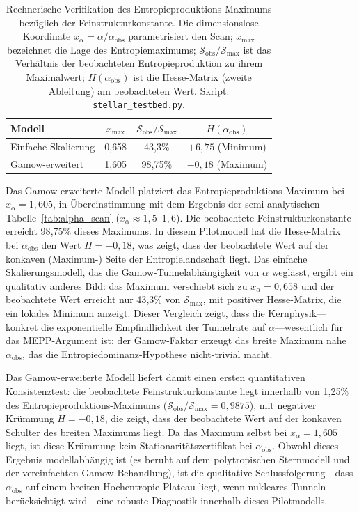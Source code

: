 \documentclass[12pt,a4paper]{article}
\theoremstyle{remark}
\begin{document}
\begin{table}[ht]
\centering
\caption{Rechnerische Verifikation des Entropieproduktions-Maximums bez\"uglich der Feinstrukturkonstante. Die dimensionslose Koordinate $x_\alpha = \alpha / \alpha_{\text{obs}}$ parametrisiert den Scan; $x_{\max}$ bezeichnet die Lage des Entropiemaximums; $\mathcal{S}_{\text{obs}} / \mathcal{S}_{\max}$ ist das Verh\"altnis der beobachteten Entropieproduktion zu ihrem Maximalwert; $H(\alpha_{\text{obs}})$ ist die Hesse-Matrix (zweite Ableitung) am beobachteten Wert. Skript: \texttt{stellar\_testbed.py}.}
\label{tab:comp-verification-alpha}
\begin{tabular}{lccc}
\toprule
\textbf{Modell} & $x_{\max}$ & $\mathcal{S}_{\text{obs}} / \mathcal{S}_{\max}$ & $H(\alpha_{\text{obs}})$ \\
\midrule
Einfache Skalierung & 0{,}658 & 43{,}3\% & $+6{,}75$ (Minimum) \\
Gamow-erweitert & 1{,}605 & 98{,}75\% & $-0{,}18$ (Maximum) \\
\bottomrule
\end{tabular}
\end{table}

Das Gamow-erweiterte Modell platziert das Entropieproduktions-Maximum bei $x_\alpha = 1{,}605$, in \"Ubereinstimmung mit dem Ergebnis der semi-analytischen Tabelle~\ref{tab:alpha_scan} ($x_\alpha \approx 1{,}5$--$1{,}6$). Die beobachtete Feinstrukturkonstante erreicht 98{,}75\% dieses Maximums. In diesem Pilotmodell hat die Hesse-Matrix bei $\alpha_{\text{obs}}$ den Wert $H = -0{,}18$, was zeigt, dass der beobachtete Wert auf der konkaven (Maximum-) Seite der Entropielandschaft liegt. Das einfache Skalierungsmodell, das die Gamow-Tunnelabh\"angigkeit von $\alpha$ wegl\"asst, ergibt ein qualitativ anderes Bild: das Maximum verschiebt sich zu $x_\alpha = 0{,}658$ und der beobachtete Wert erreicht nur 43{,}3\% von $\mathcal{S}_{\max}$, mit positiver Hesse-Matrix, die ein lokales Minimum anzeigt. Dieser Vergleich zeigt, dass die Kernphysik---konkret die exponentielle Empfindlichkeit der Tunnelrate auf $\alpha$---wesentlich f\"ur das MEPP-Argument ist: der Gamow-Faktor erzeugt das breite Maximum nahe $\alpha_{\text{obs}}$, das die Entropiedominanz-Hypothese nicht-trivial macht.

Das Gamow-erweiterte Modell liefert damit einen ersten quantitativen Konsistenztest: die beobachtete Feinstrukturkonstante liegt innerhalb von 1{,}25\% des Entropieproduktions-Maximums ($\mathcal{S}_{\text{obs}}/\mathcal{S}_{\max} = 0{,}9875$), mit negativer Kr\"ummung $H = -0{,}18$, die zeigt, dass der beobachtete Wert auf der konkaven Schulter des breiten Maximums liegt. Da das Maximum selbst bei $x_\alpha=1{,}605$ liegt, ist diese Kr\"ummung kein Stationarit\"atszertifikat bei $\alpha_{\text{obs}}$. Obwohl dieses Ergebnis modellabh\"angig ist (es beruht auf dem polytropischen Sternmodell und der vereinfachten Gamow-Behandlung), ist die qualitative Schlussfolgerung---dass $\alpha_{\text{obs}}$ auf einem breiten Hochentropie-Plateau liegt, wenn nukleares Tunneln ber\"ucksichtigt wird---eine robuste Diagnostik innerhalb dieses Pilotmodells.
\end{document}
